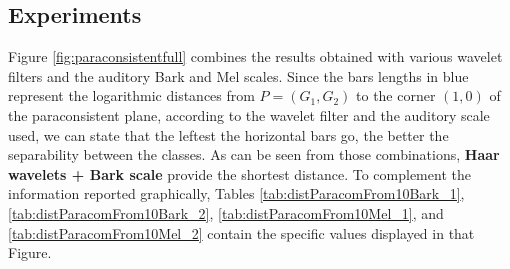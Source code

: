 \subsection{Experiments}
	\par Figure \ref{fig:paraconsistentfull} combines the results obtained with various wavelet filters and the auditory Bark and Mel scales. Since the bars lengths in blue represent the logarithmic distances from $P=(G_1,G_2)$ to the corner $(1,0)$ of the paraconsistent plane, according to the wavelet filter and the auditory scale used, we can state that the leftest the horizontal bars go, the better the separability between the classes. As can be seen from those combinations, \textbf{Haar wavelets + Bark scale} provide the shortest distance. To complement the information reported graphically, Tables \ref{tab:distParacomFrom10Bark_1}, \ref{tab:distParacomFrom10Bark_2}, \ref{tab:distParacomFrom10Mel_1}, and \ref{tab:distParacomFrom10Mel_2} contain the specific values displayed in that Figure.
	\\
